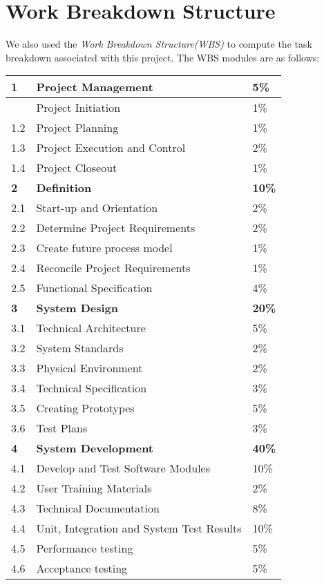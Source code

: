 \section{Work Breakdown Structure}
We also used the \emph{Work Breakdown Structure(WBS)} to compute the task breakdown associated with this project. The WBS modules are as follows: \newline
\begin{table}[h]
\begin{tabular}{|p{1cm}|p{10cm}|p{1cm}|}
\hline
\textbf{1} 	& \textbf{Project Management} & \textbf{5\%} \\ \hline
\indent 1.1	& Project Initiation & 1\% \\
1.2	& Project Planning & 1\% \\
1.3	& Project Execution and Control & 2\% \\
1.4	& Project Closeout & 1\% \\ \hline
\textbf{2}	& \textbf{Definition} & \textbf{10\%} \\ \hline
2.1	& Start-up and Orientation & 2\% \\
2.2	& Determine Project Requirements & 2\% \\
2.3	& Create future process model & 1\% \\
2.4	& Reconcile Project Requirements & 1\% \\
2.5	& Functional Specification & 4\% \\ \hline
\textbf{3}	& \textbf{System Design} & \textbf{20\%} \\ \hline
3.1	& Technical Architecture  & 5\% \\ 
3.2	& System Standards & 2\% \\ 
3.3	& Physical Environment & 2\% \\ 
3.4	& Technical Specification & 3\% \\ 
3.5	& Creating Prototypes & 5\% \\ 
3.6	& Test Plans & 3\% \\ \hline
\textbf{4}	& \textbf{System Development} & \textbf{40\%} \\ \hline
4.1	& Develop and Test Software Modules & 10\% \\ 
4.2	& User Training Materials & 2\% \\ 
4.3	& Technical Documentation & 8\% \\ 
4.4	& Unit, Integration and System Test Results & 10\% \\ 
4.5	& Performance testing & 5\% \\ 
4.6	& Acceptance testing & 5\% \\ \hline

\end{tabular}
\end{table}
